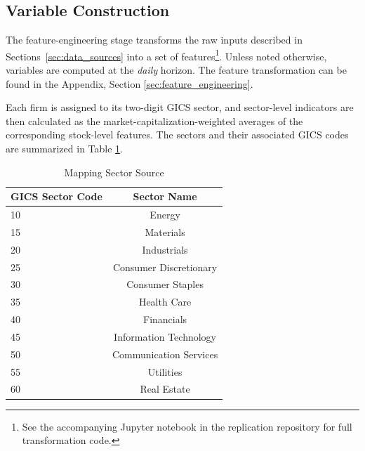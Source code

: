 \subsection{Variable Construction}\label{sec:var_construct}
The feature-engineering stage transforms the raw inputs described in Sections~\ref{sec:data_sources} into a set of features\footnote{See the accompanying Jupyter notebook in the replication repository for full transformation code.}. Unless noted otherwise, variables are computed at the \emph{daily} horizon. The feature transformation can be found in the Appendix, Section \ref{sec:feature_engineering}.


Each firm is assigned to its two-digit GICS sector, and sector-level indicators are then calculated as the market-capitalization-weighted averages of the corresponding stock-level features.  The sectors and their associated GICS codes are summarized in Table \ref{tab:sectors_mapp}.  

\begin{table}[htbp]
     \centering
     \caption{Mapping Sector Source}
     \label{tab:sectors_mapp}
     \begin{threeparttable}             %
         \begin{tabular}{@{}l c@{}}
             \toprule
             \textbf{GICS Sector Code} & \textbf{Sector Name}\\
             \midrule
             10 & Energy\\
             15 & Materials\\
             20 & Industrials\\
             25 & Consumer Discretionary\\
             30 & Consumer Staples\\
             35 & Health Care\\
             40 & Financials\\
             45 & Information Technology\\
             50 & Communication Services\\
             55 & Utilities\\
             60 & Real Estate\\
             \bottomrule
         \end{tabular}
 
     \end{threeparttable}               %
 \end{table}

